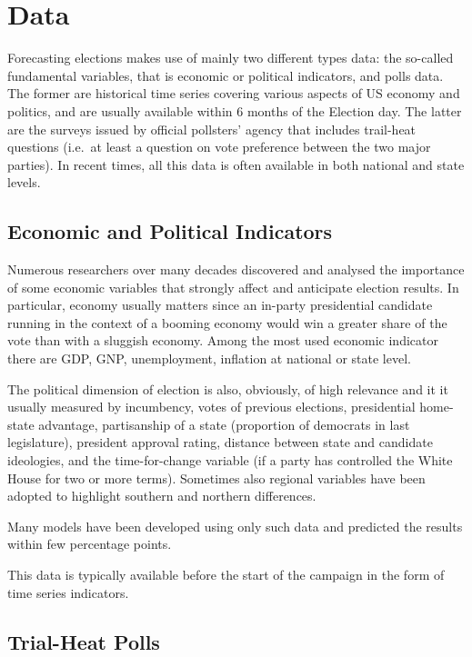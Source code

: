 \documentclass[
  12pt]{article}
\begin{document}
\hypertarget{data}{%
\section{Data}\label{data}}

Forecasting elections makes use of mainly two different types data: the
so-called fundamental variables, that is economic or political
indicators, and polls data. The former are historical time series
covering various aspects of US economy and politics, and are usually
available within 6 months of the Election day. The latter are the
surveys issued by official pollsters' agency that includes trail-heat
questions (i.e.~at least a question on vote preference between the two
major parties). In recent times, all this data is often available in
both national and state levels.

\hypertarget{economic-and-political-indicators}{%
\subsection{Economic and Political
Indicators}\label{economic-and-political-indicators}}

Numerous researchers over many decades discovered and analysed the
importance of some economic variables that strongly affect and
anticipate election results. In particular, economy usually matters
since an in-party presidential candidate running in the context of a
booming economy would win a greater share of the vote than with a
sluggish economy. Among the most used economic indicator there are GDP,
GNP, unemployment, inflation at national or state level.

The political dimension of election is also, obviously, of high
relevance and it it usually measured by incumbency, votes of previous
elections, presidential home-state advantage, partisanship of a state
(proportion of democrats in last legislature), president approval
rating, distance between state and candidate ideologies, and the
time-for-change variable (if a party has controlled the White House for
two or more terms). Sometimes also regional variables have been adopted
to highlight southern and northern differences.

Many models have been developed using only such data and predicted the
results within few percentage points.

This data is typically available before the start of the campaign in the
form of time series indicators.

\hypertarget{trial-heat-polls}{%
\subsection{Trial-Heat Polls}\label{trial-heat-polls}}
\end{document}
